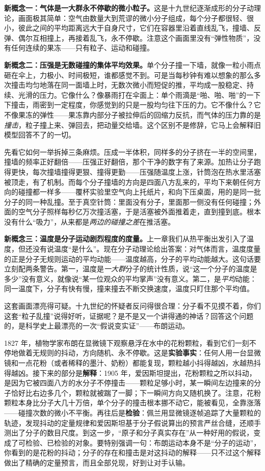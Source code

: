 \begin{mainline}
\textbf{新概念一：气体是一大群永不停歇的微小粒子。}这是十九世纪逐渐成形的分子动理论，画面极其简单：空气由数量大到荒谬的微小分子组成，每个分子都很轻、很小，彼此之间的平均距离远大于自身尺寸，它们在容器里沿着直线乱飞，撞墙、反弹、偶尔互相撞上，再接着乱飞，永不停歇。注意这个画面里没有“弹性物质”，没有任何连续的果冻——只有粒子、运动和碰撞。

\textbf{新概念二：压强是无数碰撞的集体平均效果。}单个分子撞一下墙，就像一粒小雨点砸在伞上，力极小、时间极短，谁都感觉不到。可是当每秒钟有难以想象的那么多次撞击均匀地落在同一面墙上时，无数次微小而短促的推，平均成一股稳定、持续、光滑的压力。它像什么？像暴雨打在伞面上：单个雨滴是“啪、啪、啪”的一下下撞击，雨密到一定程度，你感觉到的只是一股均匀往下压的力。它不像什么？它不像果冻的弹性——果冻靠内部分子被拉伸后的回缩力反抗，而气体的压力靠的是\emph{撞击}，粒子撞上来、弹回去，把动量交给墙。这个区别不是修辞，它马上会解释旧模型回答不了的一切。

先看它如何一举拆掉三条麻烦。压成一半体积，同样多的分子挤在一半的空间里，撞墙的频率正好翻倍——压强正好翻倍，那个干净的数字有了来源。加热让分子跑得更快，每次撞墙撞得更狠、撞得更勤——压强随温度上涨，针筒泡在热水里活塞被顶走，有了机制。而每个分子撞墙的方向是四面八方乱来的，平均下来朝任何方向的碰撞都一样多——覆杯实验里空气向上托纸片，和向下压桌面，用的是同一批分子的同一种乱撞。至于真空针筒：里面没有分子，里面那一侧没有任何碰撞；外面的空气分子照样每秒亿万次撞活塞，于是活塞被外面推着走，直到撞到底。根本没有什么“吸力”，从来都是\emph{两边的碰撞之差}在推活塞。

\textbf{新概念三：温度是分子运动剧烈程度的度量。}上一章我们从热平衡出发引入了温度，但还没有说温度“是什么”。现在分子动理论给出答案：对气体而言，温度度量的正是分子无规则运动的平均动能——温度越高，分子的平均动能越大。这句话要立刻配两条警告。第一，温度是\emph{一大群}分子的统计性质，说“这一个分子的温度是多少”没有意义，就像说“某一位观众的平均掌声”没有意义。第二，是\emph{平均}动能：同一温度下，分子有快有慢，撞来撞去不断交换速度，温度只盯住那个平均值。
\end{mainline}

这套画面漂亮得可疑。十九世纪的怀疑者反问得很合理：分子看不见摸不着，你们这套“粒子乱撞”说得好听，证据呢？是不是又一个讲得通的神话？回答这个问题的，是科学史上最漂亮的一次“假说变实证”——布朗运动。

1827 年，植物学家布朗在显微镜下观察悬浮在水中的花粉颗粒，看到它们一刻不停地做着无规则的抖动，方向随机、永不停歇。这是\textbf{实验事实}：任何人用一台显微镜和一点花粉（或者稀释的墨汁、奶粉）都能复现，颗粒越小抖得越凶，水越热抖得越凶。接下来的部分是\textbf{解释}：1905 年，爱因斯坦提出，花粉颗粒之所以抖动，是因为它被四面八方的水分子不停撞击——颗粒足够小时，某一瞬间左边撞来的分子恰好比右边多几个，颗粒就被踹了一脚；下一瞬间方向又随机换了。注意，花粉颗粒本身比分子大几十万倍，单个分子的撞击根本挪不动它，能被看见，全靠涨落——碰撞次数的微小不平衡。再往后是\textbf{检验}：佩兰用显微镜逐帧追踪了大量颗粒的轨迹，发现抖动的定量规律和爱因斯坦基于分子假说算出的预言严丝合缝，还顺手测出了分子的数目尺度。到这一步，“原子和分子真实存在”从一种好用的假说，变成了可检验、已检验的对象。要特别强调一句：布朗运动本身不是“分子的运动”，你看到的是花粉的抖动；分子的存在和撞击是对这抖动的解释——只不过这个解释做出了精确的定量预言，而且全部兑现，好到让对手认输。

